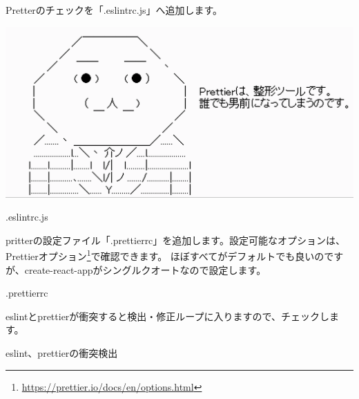Pretterのチェックを「.eslintrc.js」へ追加します。

\begin{reviewimage}[H]%
\includegraphics[width=0.7\maxwidth]{./images/02-create-react-app/prettier.png}%
\label{image:02-create-react-app:prettier}
\end{reviewimage}
\def\startercodeblockfontsize{}
\begin{starterprogram}[]{.eslintrc.js}\end{starterprogram}

pritterの設定ファイル「.prettierrc」を追加します。設定可能なオプションは、
Prettierオプション\footnote{\url{https://prettier.io/docs/en/options.html}}で確認できます。
ほぼすべてがデフォルトでも良いのですが、create{-}react{-}appがシングルクオートなので設定します。

\def\startercodeblockfontsize{}
\begin{starterprogram}[]{.prettierrc}\end{starterprogram}

eslintとprettierが衝突すると検出・修正ループに入りますので、チェックします。

\def\startercodeblockfontsize{}
\begin{starterterminal}[]{eslint、prettierの衝突検出}\end{starterterminal}

